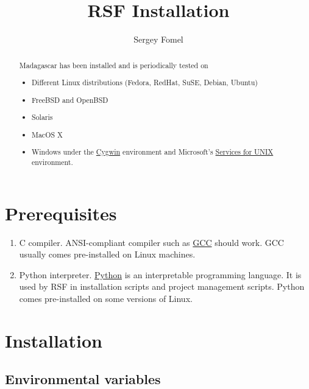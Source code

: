 \title{RSF Installation}
\author{Sergey Fomel}

%

\maketitle

\begin{abstract}
Madagascar has been installed and is periodically tested on
\begin{itemize}
\item Different Linux distributions (Fedora, RedHat, SuSE, Debian, Ubuntu)
\item FreeBSD and OpenBSD
\item Solaris
\item MacOS X
\item Windows under the \href{http://www.cygwin.com/}{Cygwin} environment and 
Microsoft's \href{http://www.microsoft.com/technet/interopmigration/unix/sfu/default.mspx}{Services for UNIX} environment.
\end{itemize}
\end{abstract}

\section{Prerequisites}

\begin{enumerate}
\item C compiler. ANSI-compliant compiler such as
  \href{http://gcc.gnu.org/}{GCC} should work. GCC usually comes pre-installed
  on Linux machines.
\item Python interpreter. \href{http://www.python.org/}{Python} is an
  interpretable programming language. It is used by RSF in installation
  scripts and project management scripts.  Python comes pre-installed on
  some versions of Linux.
\end{enumerate}

\section{Installation}

\subsection{Environmental variables}

